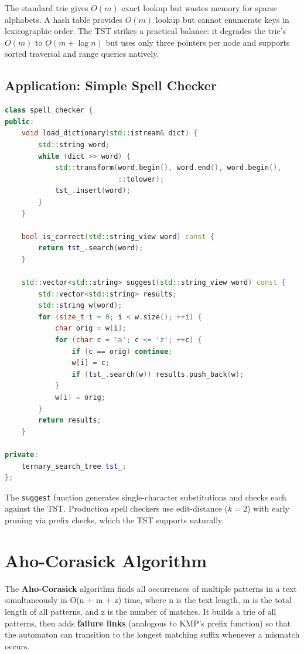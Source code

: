 The standard trie gives $O(m)$ exact lookup but wastes memory for sparse alphabets. A hash table provides $O(m)$ lookup but cannot enumerate keys in lexicographic order. The TST strikes a practical balance: it degrades the trie's $O(m)$ to $O(m + \log n)$ but uses only three pointers per node and supports sorted traversal and range queries natively.

\subsection{Application: Simple Spell Checker}

\begin{lstlisting}[language=C++]
class spell_checker {
public:
    void load_dictionary(std::istream& dict) {
        std::string word;
        while (dict >> word) {
            std::transform(word.begin(), word.end(), word.begin(),
                           ::tolower);
            tst_.insert(word);
        }
    }

    bool is_correct(std::string_view word) const {
        return tst_.search(word);
    }

    std::vector<std::string> suggest(std::string_view word) const {
        std::vector<std::string> results;
        std::string w(word);
        for (size_t i = 0; i < w.size(); ++i) {
            char orig = w[i];
            for (char c = 'a'; c <= 'z'; ++c) {
                if (c == orig) continue;
                w[i] = c;
                if (tst_.search(w)) results.push_back(w);
            }
            w[i] = orig;
        }
        return results;
    }

private:
    ternary_search_tree tst_;
};
\end{lstlisting}

The \texttt{suggest} function generates single-character substitutions and checks each against the TST. Production spell checkers use edit-distance ($k = 2$) with early pruning via prefix checks, which the TST supports naturally.

\section{Aho-Corasick Algorithm}

The \textbf{Aho-Corasick} algorithm finds all occurrences of multiple patterns in a text simultaneously in O(n + m + z) time, where n is the text length, m is the total length of all patterns, and z is the number of matches. It builds a trie of all patterns, then adds \textbf{failure links} (analogous to KMP's prefix function) so that the automaton can transition to the longest matching suffix whenever a mismatch occurs.

